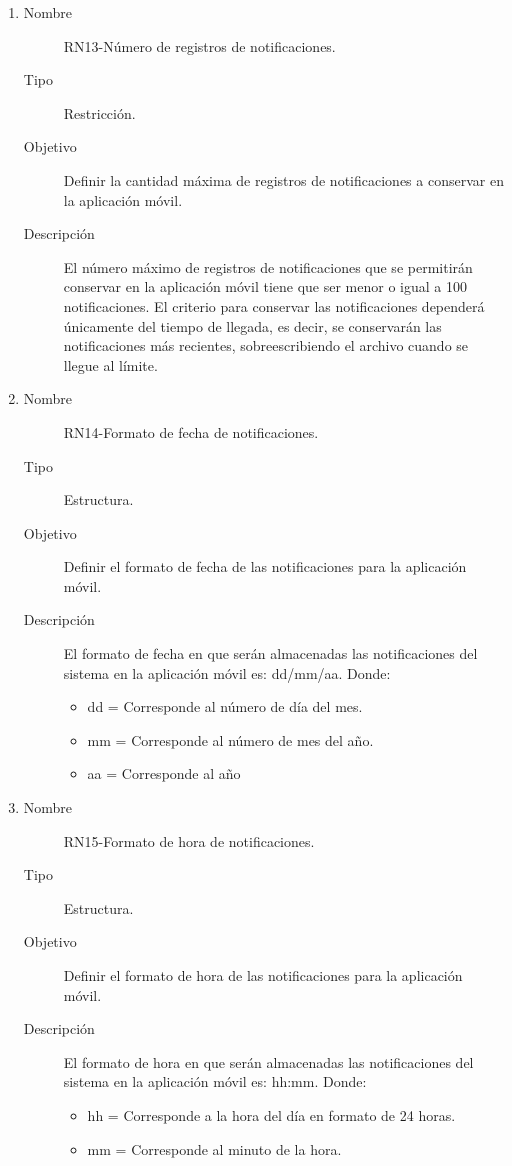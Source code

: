 \begin{enumerate}[label=RN\arabic*.]
\item \label{RN13}
		\begin{description}
			\item[Nombre] RN13-Número de registros de notificaciones.
			\item[Tipo] Restricción.
			\item[Objetivo] Definir la cantidad máxima de registros de notificaciones a conservar en la aplicación móvil.
			\item[Descripción] El número máximo de registros de notificaciones que se permitirán conservar en la aplicación móvil tiene que ser menor o igual a 100 notificaciones. El criterio para conservar las notificaciones dependerá únicamente del tiempo de llegada, es decir, se conservarán las notificaciones más recientes, sobreescribiendo el archivo cuando se llegue al límite.   
		\end{description}
		
\item \label{RN14}
		\begin{description}
			\item[Nombre] RN14-Formato de fecha de notificaciones.
			\item[Tipo] Estructura.
			\item[Objetivo] Definir el formato de fecha de las notificaciones para la aplicación móvil.
			\item[Descripción] El formato de fecha en que serán almacenadas las notificaciones del sistema en la aplicación móvil es: dd/mm/aa.
			Donde:
			\begin{itemize}
		 		\item dd = Corresponde al número de día del mes.
		 		\item mm = Corresponde al número de mes del año.
		 		\item aa = Corresponde al año
		    \end{itemize}
		\end{description}
		
\item \label{RN15}
		\begin{description}
			\item[Nombre] RN15-Formato de hora de notificaciones.
			\item[Tipo] Estructura.
			\item[Objetivo] Definir el formato de hora de las notificaciones para la aplicación móvil.
			\item[Descripción] El formato de hora en que serán almacenadas las notificaciones del sistema en la aplicación móvil es: hh:mm.
			Donde:
			\begin{itemize}
		 		\item hh = Corresponde a la hora del día en formato de 24 horas.
		 		\item mm = Corresponde al minuto de la hora.
		    \end{itemize}
		\end{description}


\end{enumerate}
